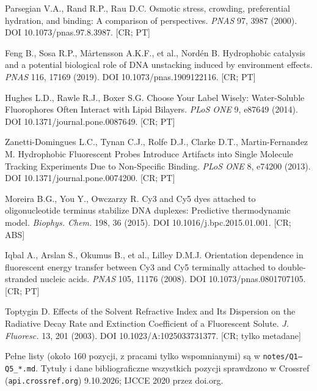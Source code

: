 \documentclass[10pt,a4paper]{article}
\begin{document}
\begin{enumerate}[label={[\arabic*]},ref={\arabic*},leftmargin=*,itemsep=0pt]
\item\label{b:parsegian} Parsegian V.A., Rand R.P., Rau D.C. Osmotic stress, crowding, preferential hydration, and binding: A comparison of perspectives. \emph{PNAS} 97, 3987 (2000). DOI 10.1073/pnas.97.8.3987. [CR; PT]
\item\label{b:feng} Feng B., Sosa R.P., Mårtensson A.K.F., et al., Nordén B. Hydrophobic catalysis and a potential biological role of DNA unstacking induced by environment effects. \emph{PNAS} 116, 17169 (2019). DOI 10.1073/pnas.1909122116. [CR; PT]
\item\label{b:hughes} Hughes L.D., Rawle R.J., Boxer S.G. Choose Your Label Wisely: Water-Soluble Fluorophores Often Interact with Lipid Bilayers. \emph{PLoS ONE} 9, e87649 (2014). DOI 10.1371/journal.pone.0087649. [CR; PT]
\item\label{b:zanetti} Zanetti-Domingues L.C., Tynan C.J., Rolfe D.J., Clarke D.T., Martin-Fernandez M. Hydrophobic Fluorescent Probes Introduce Artifacts into Single Molecule Tracking Experiments Due to Non-Specific Binding. \emph{PLoS ONE} 8, e74200 (2013). DOI 10.1371/journal.pone.0074200. [CR; PT]
\item\label{b:moreira} Moreira B.G., You Y., Owczarzy R. Cy3 and Cy5 dyes attached to oligonucleotide terminus stabilize DNA duplexes: Predictive thermodynamic model. \emph{Biophys. Chem.} 198, 36 (2015). DOI 10.1016/j.bpc.2015.01.001. [CR; ABS]
\item\label{b:iqbal} Iqbal A., Arslan S., Okumus B., et al., Lilley D.M.J. Orientation dependence in fluorescent energy transfer between Cy3 and Cy5 terminally attached to double-stranded nucleic acids. \emph{PNAS} 105, 11176 (2008). DOI 10.1073/pnas.0801707105. [CR; PT]
\item\label{b:toptygin} Toptygin D. Effects of the Solvent Refractive Index and Its Dispersion on the Radiative Decay Rate and Extinction Coefficient of a Fluorescent Solute. \emph{J. Fluoresc.} 13, 201 (2003). DOI 10.1023/A:1025033731377. [CR; tylko metadane]
\end{enumerate}
Pełne listy (około 160 pozycji, z pracami tylko wspomnianymi) są w \texttt{notes/Q1--Q5\_*.md}. Tytuły i dane bibliograficzne wszystkich pozycji sprawdzono w Crossref (\texttt{api.crossref.org}) 9.10.2026; IJCCE 2020 przez doi.org.
\end{document}
